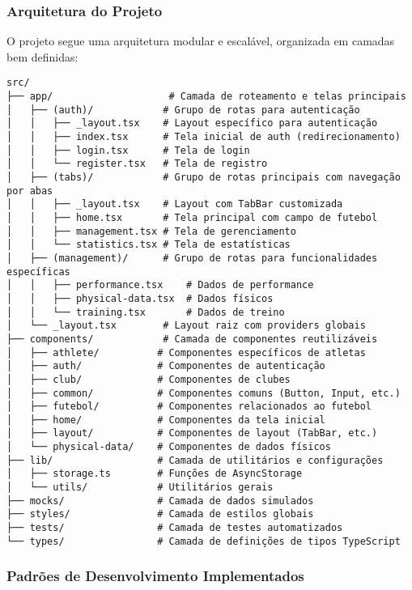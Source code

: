 \subsubsection{Arquitetura do Projeto}
O projeto segue uma arquitetura modular e escalável, organizada em camadas bem definidas:

\begin{verbatim}
src/
├── app/                    # Camada de roteamento e telas principais
│   ├── (auth)/            # Grupo de rotas para autenticação
│   │   ├── _layout.tsx    # Layout específico para autenticação
│   │   ├── index.tsx      # Tela inicial de auth (redirecionamento)
│   │   ├── login.tsx      # Tela de login
│   │   └── register.tsx   # Tela de registro
│   ├── (tabs)/            # Grupo de rotas principais com navegação por abas
│   │   ├── _layout.tsx    # Layout com TabBar customizada
│   │   ├── home.tsx       # Tela principal com campo de futebol
│   │   ├── management.tsx # Tela de gerenciamento
│   │   └── statistics.tsx # Tela de estatísticas
│   ├── (management)/      # Grupo de rotas para funcionalidades específicas
│   │   ├── performance.tsx    # Dados de performance
│   │   ├── physical-data.tsx  # Dados físicos
│   │   └── training.tsx       # Dados de treino
│   └── _layout.tsx        # Layout raiz com providers globais
├── components/            # Camada de componentes reutilizáveis
│   ├── athlete/          # Componentes específicos de atletas
│   ├── auth/             # Componentes de autenticação
│   ├── club/             # Componentes de clubes
│   ├── common/           # Componentes comuns (Button, Input, etc.)
│   ├── futebol/          # Componentes relacionados ao futebol
│   ├── home/             # Componentes da tela inicial
│   ├── layout/           # Componentes de layout (TabBar, etc.)
│   └── physical-data/    # Componentes de dados físicos
├── lib/                  # Camada de utilitários e configurações
│   ├── storage.ts        # Funções de AsyncStorage
│   └── utils/            # Utilitários gerais
├── mocks/                # Camada de dados simulados
├── styles/               # Camada de estilos globais
├── tests/                # Camada de testes automatizados
└── types/                # Camada de definições de tipos TypeScript
\end{verbatim}

\subsubsection{Padrões de Desenvolvimento Implementados}


